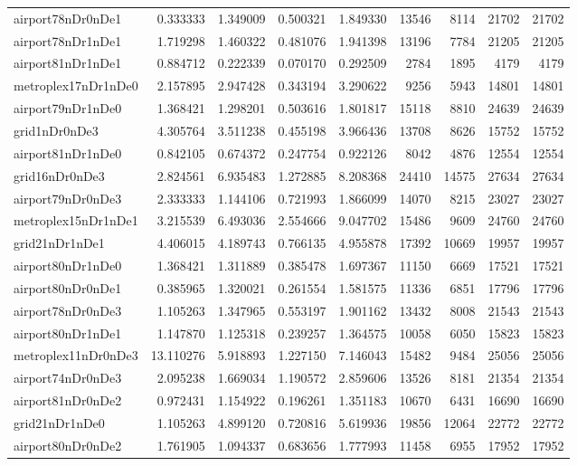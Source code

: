 \begin{longtable}{|l|r|r|r|r|r|r|r|r|}
airport78nDr0nDe1 & 0.333333 & 1.349009 & 0.500321 & 1.849330 & 13546 & 8114 & 21702 & 21702 \\
airport78nDr1nDe1 & 1.719298 & 1.460322 & 0.481076 & 1.941398 & 13196 & 7784 & 21205 & 21205 \\
airport81nDr1nDe1 & 0.884712 & 0.222339 & 0.070170 & 0.292509 & 2784 & 1895 & 4179 & 4179 \\
metroplex17nDr1nDe0 & 2.157895 & 2.947428 & 0.343194 & 3.290622 & 9256 & 5943 & 14801 & 14801 \\
airport79nDr1nDe0 & 1.368421 & 1.298201 & 0.503616 & 1.801817 & 15118 & 8810 & 24639 & 24639 \\
grid1nDr0nDe3 & 4.305764 & 3.511238 & 0.455198 & 3.966436 & 13708 & 8626 & 15752 & 15752 \\
airport81nDr1nDe0 & 0.842105 & 0.674372 & 0.247754 & 0.922126 & 8042 & 4876 & 12554 & 12554 \\
grid16nDr0nDe3 & 2.824561 & 6.935483 & 1.272885 & 8.208368 & 24410 & 14575 & 27634 & 27634 \\
airport79nDr0nDe3 & 2.333333 & 1.144106 & 0.721993 & 1.866099 & 14070 & 8215 & 23027 & 23027 \\
metroplex15nDr1nDe1 & 3.215539 & 6.493036 & 2.554666 & 9.047702 & 15486 & 9609 & 24760 & 24760 \\
grid21nDr1nDe1 & 4.406015 & 4.189743 & 0.766135 & 4.955878 & 17392 & 10669 & 19957 & 19957 \\
airport80nDr1nDe0 & 1.368421 & 1.311889 & 0.385478 & 1.697367 & 11150 & 6669 & 17521 & 17521 \\
airport80nDr0nDe1 & 0.385965 & 1.320021 & 0.261554 & 1.581575 & 11336 & 6851 & 17796 & 17796 \\
airport78nDr0nDe3 & 1.105263 & 1.347965 & 0.553197 & 1.901162 & 13432 & 8008 & 21543 & 21543 \\
airport80nDr1nDe1 & 1.147870 & 1.125318 & 0.239257 & 1.364575 & 10058 & 6050 & 15823 & 15823 \\
metroplex11nDr0nDe3 & 13.110276 & 5.918893 & 1.227150 & 7.146043 & 15482 & 9484 & 25056 & 25056 \\
airport74nDr0nDe3 & 2.095238 & 1.669034 & 1.190572 & 2.859606 & 13526 & 8181 & 21354 & 21354 \\
airport81nDr0nDe2 & 0.972431 & 1.154922 & 0.196261 & 1.351183 & 10670 & 6431 & 16690 & 16690 \\
grid21nDr1nDe0 & 1.105263 & 4.899120 & 0.720816 & 5.619936 & 19856 & 12064 & 22772 & 22772 \\
airport80nDr0nDe2 & 1.761905 & 1.094337 & 0.683656 & 1.777993 & 11458 & 6955 & 17952 & 17952 \\

\end{longtable}
